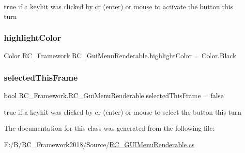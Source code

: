 true if a keyhit was clicked by cr (enter) or mouse to activate the button this turn 

\mbox{\label{class_r_c___framework_1_1_r_c___gui_menu_renderable_af5e943fb2d0a14e29fa96203743637b9}} 
\subsubsection{\texorpdfstring{highlight\+Color}{highlightColor}}
{\footnotesize\ttfamily Color R\+C\+\_\+\+Framework.\+R\+C\+\_\+\+Gui\+Menu\+Renderable.\+highlight\+Color = Color.\+Black}

\mbox{\label{class_r_c___framework_1_1_r_c___gui_menu_renderable_a5092508ec1a58aaef9926a1259bc13e5}} 
\subsubsection{\texorpdfstring{selected\+This\+Frame}{selectedThisFrame}}
{\footnotesize\ttfamily bool R\+C\+\_\+\+Framework.\+R\+C\+\_\+\+Gui\+Menu\+Renderable.\+selected\+This\+Frame = false}



true if a keyhit was clicked by cr (enter) or mouse to select the button this turn 



The documentation for this class was generated from the following file\+:\begin{DoxyCompactItemize}
\item 
F\+:/\+B/\+R\+C\+\_\+\+Framework2018/\+Source/\mbox{\hyperlink{_r_c___g_u_i_menu_renderable_8cs}{R\+C\+\_\+\+G\+U\+I\+Menu\+Renderable.\+cs}}\end{DoxyCompactItemize}
